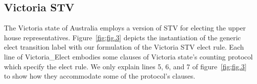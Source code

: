 \documentclass{llncs}
\begin{document}
\subsection{Victoria STV}
The Victoria state of Australia employs a version of STV for  electing the upper house representatives. 
Figure~\ref{fig;fig.3} depicts the instantiation of the generic elect transition label with our formulation of the Victoria STV elect rule. Each line of {\selectfont Victoria\_Elect} embodies some clauses of Victoria state's counting protocol which specify the elect rule. We only explain lines 5, 6, and 7 of figure~\ref{fig;fig.3} to show how they accommodate some  of the protocol's clauses. 
\end{document}
